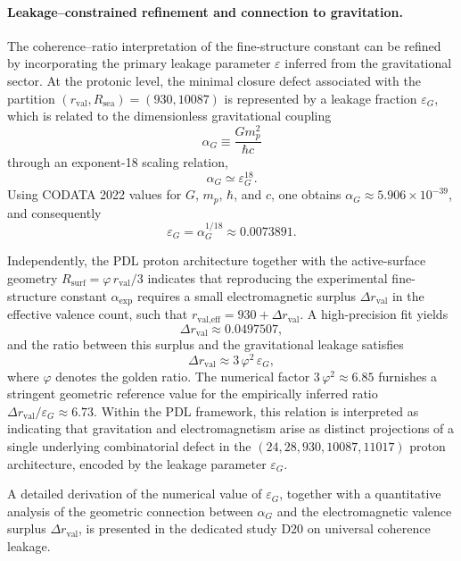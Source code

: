 \documentclass[11pt,a4paper]{article}
\begin{document}
\paragraph{Leakage–constrained refinement and connection to gravitation.}

The coherence–ratio interpretation of the fine-structure constant can be refined by incorporating the primary leakage parameter $\varepsilon$ inferred from the gravitational sector.\cite{Universal_Coherence_Leakage_2026}
At the protonic level, the minimal closure defect associated with the partition $(r_{\text{val}},R_{\text{sea}})=(930,10087)$ is represented by a leakage fraction $\varepsilon_G$, which is related to the dimensionless gravitational coupling
\[
\alpha_G \equiv \frac{G m_p^2}{\hbar c}
\]
through an exponent-18 scaling relation,
\[
\alpha_G \simeq \varepsilon_G^{18}.
\]
Using CODATA 2022 values for $G$, $m_p$, $\hbar$, and $c$, one obtains
$\alpha_G \approx 5.906\times 10^{-39}$, and consequently
\[
\varepsilon_G = \alpha_G^{1/18} \approx 0.0073891.
\]

Independently, the PDL proton architecture together with the active-surface geometry
$R_{\text{surf}} = \varphi\, r_{\text{val}}/3$ indicates that reproducing the experimental fine-structure constant
$\alpha_{\text{exp}}$ requires a small electromagnetic surplus
$\Delta r_{\text{val}}$ in the effective valence count, such that $r_{\text{val,eff}} = 930 + \Delta r_{\text{val}}$.\cite{Alpha_PDL_v2_2026,Universal_Coherence_Leakage_2026}
A high-precision fit yields
\[
\Delta r_{\text{val}} \approx 0.0497507,
\]
and the ratio between this surplus and the gravitational leakage satisfies
\[
\Delta r_{\text{val}} \approx 3\,\varphi^2\,\varepsilon_G,
\]
where $\varphi$ denotes the golden ratio. The numerical factor
$3\,\varphi^2 \approx 6.85$ furnishes a stringent geometric reference value for the empirically inferred ratio $\Delta r_{\text{val}} / \varepsilon_G \approx 6.73$.
Within the PDL framework, this relation is interpreted as indicating that gravitation and electromagnetism arise as distinct projections of a single underlying combinatorial defect in the $(24,28,930,10087,11017)$ proton architecture, encoded by the leakage parameter $\varepsilon_G$.

A detailed derivation of the numerical value of $\varepsilon_G$, together with a quantitative analysis of the geometric connection between $\alpha_G$ and the electromagnetic valence surplus $\Delta r_{\mathrm{val}}$, is presented in the dedicated study D20 on universal coherence leakage.\citep{Universal_Coherence_Leakage_2026}
\end{document}
